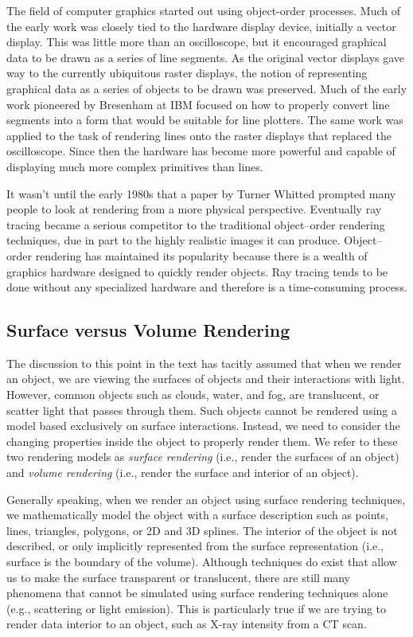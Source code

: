 The field of computer graphics started out using object-order processes. Much of the early work was closely tied to the hardware display device, initially a vector display. This was little more than an oscilloscope, but it encouraged graphical data to be drawn as a series of line segments. As the original vector displays gave way to the currently ubiquitous raster displays, the notion of representing graphical data as a series of objects to be drawn was preserved. Much of the early work pioneered by Bresenham \cite{Bresenham65} at IBM focused on how to properly convert line segments into a form that would be suitable for line plotters. The same work was applied to the task of rendering lines onto the raster displays that replaced the oscilloscope. Since then the hardware has become more powerful and capable of displaying much more complex primitives than lines.

It wasn't until the early 1980s that a paper by Turner Whitted \cite{Whitted80} prompted many people to look at rendering from a more physical perspective. Eventually ray tracing became a serious competitor to the traditional object--order rendering techniques, due in part to the highly realistic images it can produce. Object--order rendering has maintained its popularity because there is a wealth of graphics hardware designed to quickly render objects. Ray tracing tends to be done without any specialized hardware and therefore is a time-consuming process.

\subsection{Surface versus Volume Rendering}

The discussion to this point in the text has tacitly assumed that when we render an object, we are viewing the surfaces of objects and their interactions with light. However, common objects such as clouds, water, and fog, are translucent, or scatter light that passes through them. Such objects cannot be rendered using a model based exclusively on surface interactions. Instead, we need to consider the changing properties inside the object to properly render them. We refer to these two rendering models as \emph{surface rendering} (i.e., render the surfaces of an object) and \emph{volume rendering} (i.e., render the surface and interior of an object).

Generally speaking, when we render an object using surface rendering techniques, we mathematically model the object with a surface description such as points, lines, triangles, polygons, or 2D and 3D splines. The interior of the object is not described, or only implicitly represented from the surface representation (i.e., surface is the boundary of the volume). Although techniques do exist that allow us to make the surface transparent or translucent, there are still many phenomena that cannot be simulated using surface rendering techniques alone (e.g., scattering or light emission). This is particularly true if we are trying to render data interior to an object, such as X-ray intensity from a CT scan.

